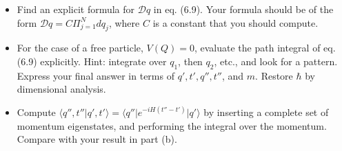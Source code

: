 \documentclass[twoside]{amsart}
\newcommand{\problemhead}[1]
  {\smallskip
   \noindent{\large\bf Problem #1.}
   }
\begin{document}
\problemhead{6.1} \begin{itemize}
\item[(a)] Find an explicit formula for $\mathcal{D}q$ in eq. (6.9).  Your formula should be of the form $\mathcal{D}q = C \Pi_{j=1}^N dq_j$, where $C$ is a constant that you should compute.  
\item[(b)] For the case of a free particle, $V(Q) =0$, evaluate the path integral of eq. (6.9) explicitly.  Hint: integrate over $q_1$, then $q_2$, etc., and look for a pattern.  Express your final answer in terms of $q',t',q'',t''$, and $m$.  Restore $\hbar$ by dimensional analysis.  
\item[(c)] Compute $\langle q'', t''|q', t' \rangle = \langle q''|e^{-iH(t''-t')} | q'\rangle$ by inserting a complete set of momentum eigenstates, and performing the integral over the momentum.  Compare with your result in part (b).  
\end{itemize}
\end{document}
